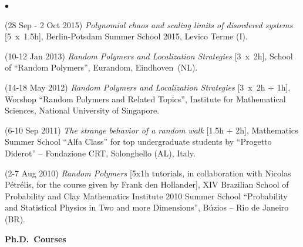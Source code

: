 \documentclass[a4paper,11pt,oneside]{amsart}
\newenvironment{myitemize}{%
\begin{list}{$\bullet$}%
 	{%
	\setlength{\itemsep}{0.3em}%
	\setlength{\topsep}{0.3em}%
	\setlength{\partopsep}{0em}%
	\setlength{\parsep}{0em}%
	\setlength{\parskip}{0em}%
	\setlength\leftmargin{1.5em}%
	\setlength\labelwidth{1.1em}%
	\setlength{\labelsep}{0.4em}%
	}%
	}%
{\end{list}}
\renewenvironment{itemize}{
\begin{myitemize}}%
{\end{myitemize}}
\begin{document}
\begin{itemize}
\item (28 Sep - 2 Oct 2015)
\emph{Polynomial chaos and scaling limits of disordered systems}
[5~x~1.5h],
Berlin-Potsdam Summer School 2015, Levico Terme (I).

\item (10-12 Jan 2013)
\emph{Random Polymers and Localization Strategies} [3~x~2h],
School of ``Random Polymers'', Eurandom, Eindhoven~(NL).

\item (14-18 May 2012)
\emph{Random Polymers and Localization Strategies} [3~x~2h + 1h],
Worshop ``Random Polymers and Related Topics'', Institute for Mathematical Sciences,
National University of Singapore.

\item (6-10 Sep 2011)
\emph{The strange behavior of a random walk} [1.5h + 2h],
Mathematics Summer School ``Alfa Class'' for top undergraduate students
by ``Progetto Diderot'' -- Fondazione CRT, Solonghello (AL), Italy.

\item (2-7 Aug 2010)
\emph{Random Polymers} 
[5x1h tutorials, in collaboration with Nicolas P\'etr\'elis,
for the course given by Frank den Hollander],
XIV Brazilian School of Probability and
Clay Mathematics Institute 2010 Summer School
``Probability and Statistical Physics in Two and more Dimensions'',
B\'uzios -- Rio de Janeiro (BR).
\end{itemize}


\medskip
{\large\sf \bfseries Ph.D.\ Courses}
\smallskip
\end{document}
